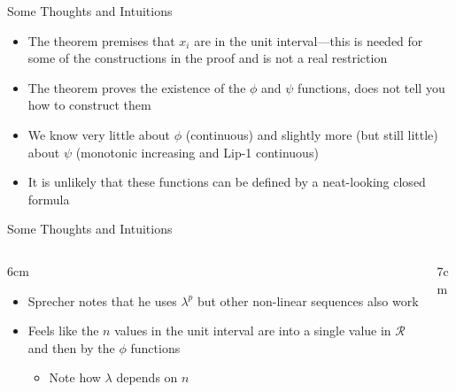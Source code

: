 \begin{frame}{Some Thoughts and Intuitions}

\begin{itemize}
\item The theorem premises that $x_i$ are in the unit interval---this
  is needed for some of the constructions in the proof and is not a
  real restriction \vspace{0.5em}
\item The theorem proves the existence of the $\phi$ and $\psi$
  functions, does not tell you how to construct them \vspace{0.5em}
\item We know very little about $\phi$ (continuous) and slightly more
  (but still little) about $\psi$ (monotonic increasing and
  Lip-1 continuous) \vspace{0.5em}
\item It is unlikely that these functions can be defined by a
  neat-looking closed formula
\end{itemize}

\end{frame}



\begin{frame}{Some Thoughts and Intuitions}

\begin{columns}

  \begin{column}{6cm}
  \begin{itemize}
  \item Sprecher notes that he uses $\lambda^p$ but other non-linear
    sequences also work \vspace{0.5em}
  \item Feels like the $n$ values in the unit interval are
     into a single value in $\mathcal{R}$ and then
     by the $\phi$ functions \vspace{0.3em}
    \begin{itemize}
    \item Note how $\lambda$ depends on $n$
    \end{itemize}
  \end{itemize}
  \end{column}

  \begin{column}{7cm}
  
  \end{column}

\end{columns}

\end{frame}



